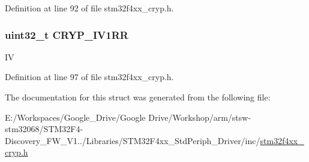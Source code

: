 Definition at line 92 of file stm32f4xx\-\_\-cryp.\-h.

\hypertarget{struct_c_r_y_p___context_aea9966b11be3f54fb553b02ab5af4b9d}{
\subsubsection[{C\-R\-Y\-P\-\_\-\-I\-V1\-R\-R}]{\setlength{\rightskip}{0pt plus 5cm}uint32\-\_\-t C\-R\-Y\-P\-\_\-\-I\-V1\-R\-R}}\label{struct_c_r_y_p___context_aea9966b11be3f54fb553b02ab5af4b9d}
I\-V 

Definition at line 97 of file stm32f4xx\-\_\-cryp.\-h.



The documentation for this struct was generated from the following file\-:\begin{DoxyCompactItemize}
\item 
E\-:/\-Workspaces/\-Google\-\_\-\-Drive/\-Google Drive/\-Workshop/arm/stsw-\/stm32068/\-S\-T\-M32\-F4-\/\-Discovery\-\_\-\-F\-W\-\_\-\-V1../\-Libraries/\-S\-T\-M32\-F4xx\-\_\-\-Std\-Periph\-\_\-\-Driver/inc/\hyperlink{stm32f4xx__cryp_8h}{stm32f4xx\-\_\-cryp.\-h}\end{DoxyCompactItemize}
